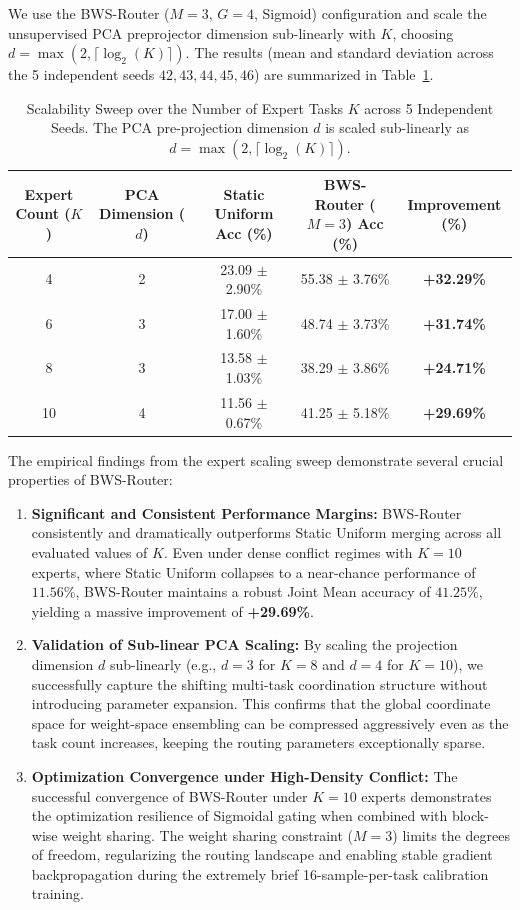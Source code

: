 We use the BWS-Router ($M=3$, $G=4$, Sigmoid) configuration and scale the unsupervised PCA preprojector dimension sub-linearly with $K$, choosing $d = \max(2, \lceil\log_2(K)\rceil)$. The results (mean and standard deviation across the 5 independent seeds $42, 43, 44, 45, 46$) are summarized in Table~\ref{tab:expert_scaling_results}.

\begin{table}[h]
\centering
\caption{Scalability Sweep over the Number of Expert Tasks $K$ across 5 Independent Seeds. The PCA pre-projection dimension $d$ is scaled sub-linearly as $d = \max(2, \lceil\log_2(K)\rceil)$.}
\label{tab:expert_scaling_results}
\footnotesize
\begin{tabular}{ccccc}
\toprule
\textbf{Expert Count ($K$)} & \textbf{PCA Dimension ($d$)} & \textbf{Static Uniform Acc (\%)} & \textbf{BWS-Router ($M=3$) Acc (\%)} & \textbf{Improvement (\%)} \\ \midrule
4  & 2 & 23.09 $\pm$ 2.90\% & 55.38 $\pm$ 3.76\% & \textbf{+32.29\%} \\
6  & 3 & 17.00 $\pm$ 1.60\% & 48.74 $\pm$ 3.73\% & \textbf{+31.74\%} \\
8  & 3 & 13.58 $\pm$ 1.03\% & 38.29 $\pm$ 3.86\% & \textbf{+24.71\%} \\
10 & 4 & 11.56 $\pm$ 0.67\% & 41.25 $\pm$ 5.18\% & \textbf{+29.69\%} \\
\bottomrule
\end{tabular}
\end{table}

The empirical findings from the expert scaling sweep demonstrate several crucial properties of BWS-Router:
\begin{enumerate}
    \item \textbf{Significant and Consistent Performance Margins:} BWS-Router consistently and dramatically outperforms Static Uniform merging across all evaluated values of $K$. Even under dense conflict regimes with $K=10$ experts, where Static Uniform collapses to a near-chance performance of $11.56\%$, BWS-Router maintains a robust Joint Mean accuracy of $41.25\%$, yielding a massive improvement of \textbf{+29.69\%}.
    \item \textbf{Validation of Sub-linear PCA Scaling:} By scaling the projection dimension $d$ sub-linearly (e.g., $d=3$ for $K=8$ and $d=4$ for $K=10$), we successfully capture the shifting multi-task coordination structure without introducing parameter expansion. This confirms that the global coordinate space for weight-space ensembling can be compressed aggressively even as the task count increases, keeping the routing parameters exceptionally sparse.
    \item \textbf{Optimization Convergence under High-Density Conflict:} The successful convergence of BWS-Router under $K=10$ experts demonstrates the optimization resilience of Sigmoidal gating when combined with block-wise weight sharing. The weight sharing constraint ($M=3$) limits the degrees of freedom, regularizing the routing landscape and enabling stable gradient backpropagation during the extremely brief 16-sample-per-task calibration training.
\end{enumerate}

